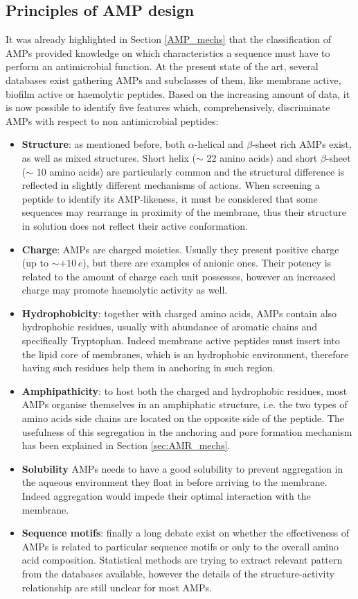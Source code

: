 \documentclass[a4paper,11pt]{extreport}
\begin{document}
\subsection{Principles of AMP design}

It was already highlighted in Section \ref{AMP_mechs} that the classification of AMPs provided knowledge on which characteristics a sequence must have to perform an antimicrobial function.
%
At the present state of the art, several databases exist gathering AMPs and subclasses of them, like membrane active, biofilm active or haemolytic  peptides.\cite{???} Based on the increasing amount of data, it is now possible to identify five features which, comprehensively, discriminate AMPs with respect to non antimicrobial peptides:
%
\begin{itemize}
\item \textbf{Structure}: as mentioned before, both $\alpha$-helical and $\beta$-sheet rich AMPs exist, as well as mixed structures. Short helix ($\sim$ 22 amino acids)\cite{verifyyyyy} and short $\beta$-sheet ($\sim$ 10 amino acids)\cite{verifyyyyy} are particularly common and the structural difference is reflected in slightly different mechanisms of actions. When screening a peptide to identify its AMP-likeness, it must be considered that some sequences may rearrange in proximity of the membrane, thus their structure in solution does not reflect their active conformation.
\item \textbf{Charge}: AMPs are charged moieties. Usually they present positive charge (up to $\sim + 10\,e$), but there are examples of anionic ones.\cite{see_example_on_AMPR} Their potency is related to the amount of charge each unit possesses, however an increased charge may promote haemolytic activity as well.\cite{???}
\item \textbf{Hydrophobicity}: together with charged amino acids, AMPs contain also hydrophobic residues, usually with abundance of aromatic chains and specifically Tryptophan. Indeed membrane active peptides must insert into the lipid core of membranes, which is an hydrophobic environment, therefore having such residues help them in anchoring in such region.
\item \textbf{Amphipathicity}: to host both the charged and hydrophobic residues, most AMPs organise themselves in an amphiphatic structure, i.e. the two types of amino acids side chains are located on the opposite side of the peptide. The usefulness of this segregation in the anchoring and pore formation mechanism has been explained in Section \ref{sec:AMR_mechs}.
\item \textbf{Solubility} AMPs needs to have a good solubility to prevent aggregation in the aqueous environment they float in before arriving to the membrane. Indeed aggregation would impede their optimal interaction with the membrane.
\item \textbf{Sequence motifs}: finally a long debate exist on whether the effectiveness of AMPs is related to particular sequence motifs or only to the overall amino acid composition. Statistical methods are trying to extract relevant pattern from the databases available, however the details of the structure-activity relationship are still unclear for most AMPs.
\end{itemize}
\end{document}
